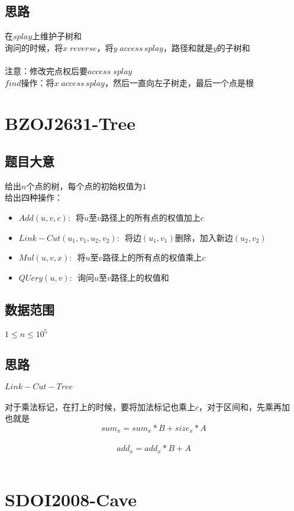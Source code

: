 \documentclass{ctexart}
\numberwithin{equation}{section}
\begin{document}
\begin{flushleft}
  \subsection{思路}
  在$splay$上维护子树和\\
  询问的时候，将$x\; reverse$，将$y\; access\, splay$，路径和就是$y$的子树和\\
  ~\\ 
  注意：修改完点权后要$access\; splay$\\
  $find$操作：将$x\; access\, splay$，然后一直向左子树走，最后一个点是根\\
  \newpage

  \section{BZOJ2631-Tree}
  \subsection{题目大意}
  给出$n$个点的树，每个点的初始权值为$1$\\
  给出四种操作：\\
  \begin{itemize}
  \item $Add(u,v,c):$\, 将$u$至$v$路径上的所有点的权值加上$c$
  \item $Link-Cut(u_1,v_1,u_2,v_2):$\, 将边$(u_1,v_1)$删除，加入新边$(u_2,v_2)$
  \item $Mul(u,v,x):$\, 将$u$至$v$路径上的所有点的权值乘上$c$
  \item $QUery(u,v):$\, 询问$u$至$v$路径上的权值和
  \end{itemize}
  \subsection{数据范围}
  $1\le n \le 10^5$
  \subsection{思路}
  $Link-Cut-Tree$\\

  ~\\
  对于乘法标记，在打上的时候，要将加法标记也乘上$c$，对于区间和，先乘再加\\
  也就是$$sum_x=sum_x*B+size_x*A$$\\
  $$add_x=add_x*B + A$$\\
  \newpage

  \section{SDOI2008-Cave}

\end{flushleft}
\end{document}
